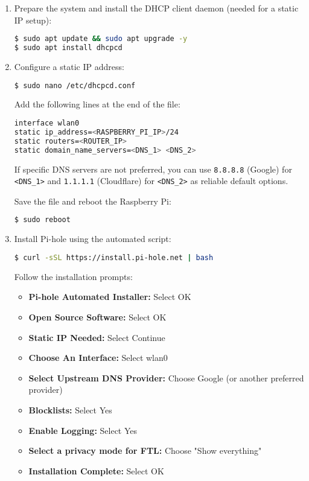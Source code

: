\begin{enumerate}
\item Prepare the system and install the DHCP client daemon (needed for a static IP setup):
\begin{lstlisting}[language=bash, breaklines=true, breakatwhitespace=true, columns=fullflexible]
$ sudo apt update && sudo apt upgrade -y
$ sudo apt install dhcpcd
\end{lstlisting}
   
\item Configure a static IP address:
\begin{lstlisting}[language=bash, breaklines=true, breakatwhitespace=true, columns=fullflexible]
$ sudo nano /etc/dhcpcd.conf
\end{lstlisting}

Add the following lines at the end of the file:
\begin{lstlisting}[language=bash, breaklines=true, breakatwhitespace=true, columns=fullflexible]
interface wlan0
static ip_address=<RASPBERRY_PI_IP>/24
static routers=<ROUTER_IP>
static domain_name_servers=<DNS_1> <DNS_2>
\end{lstlisting}

If specific DNS servers are not preferred, you can use \texttt{8.8.8.8} (Google) for \texttt{<DNS\_1>} and \texttt{1.1.1.1} (Cloudflare) for \texttt{<DNS\_2>} as reliable default options.

Save the file and reboot the Raspberry Pi:
\begin{lstlisting}[language=bash, breaklines=true, breakatwhitespace=true, columns=fullflexible]
$ sudo reboot
\end{lstlisting}

\item Install Pi-hole using the automated script:
\begin{lstlisting}[language=bash, breaklines=true, breakatwhitespace=true, columns=fullflexible]
$ curl -sSL https://install.pi-hole.net | bash
\end{lstlisting}

Follow the installation prompts:
\begin{itemize}
\item \textbf{Pi-hole Automated Installer:} Select OK
\item \textbf{Open Source Software:} Select OK
\item \textbf{Static IP Needed:} Select Continue
\item \textbf{Choose An Interface:} Select wlan0
\item \textbf{Select Upstream DNS Provider:} Choose Google (or another preferred provider)
\item \textbf{Blocklists:} Select Yes
\item \textbf{Enable Logging:} Select Yes
\item \textbf{Select a privacy mode for FTL:} Choose "Show everything"
\item \textbf{Installation Complete:} Select OK
\end{itemize}


\end{enumerate}

